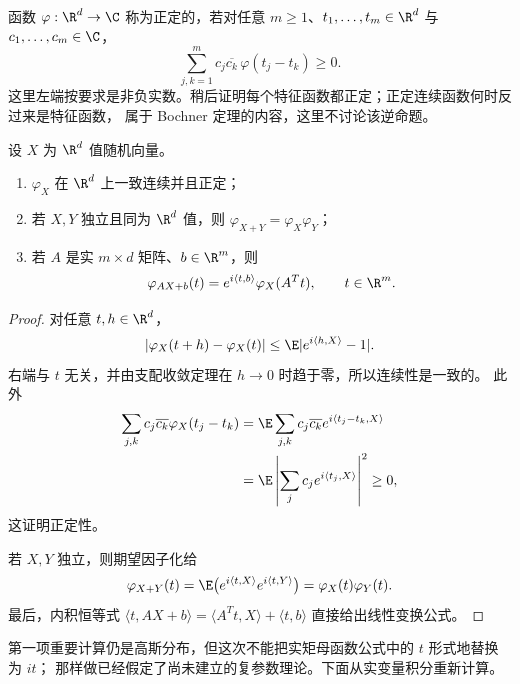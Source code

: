 \begin{definition}[正定函数]\label{def:5-4-3-2}
函数 $\varphi:\R^d\to\C$ 称为正定的，若对任意
$m\geq1$、$t_1,\dots,t_m\in\R^d$ 与 $c_1,\dots,c_m\in\C$，
\[
 \sum_{j,k=1}^mc_j\overline{c_k}\,\varphi(t_j-t_k)\geq0.
\]
这里左端按要求是非负实数。稍后证明每个特征函数都正定；正定连续函数何时反过来是特征函数，
属于 Bochner 定理的内容，这里不讨论该逆命题。
\end{definition}

\begin{proposition}[特征函数的基本性质]\label{proposition:5-4-3-1}
设 $X$ 为 $\R^d$ 值随机向量。
\begin{enumerate}
 \item $\varphi_X$ 在 $\R^d$ 上一致连续并且正定；
 \item 若 $X,Y$ 独立且同为 $\R^d$ 值，则
 $\varphi_{X+Y}=\varphi_X\varphi_Y$；
 \item 若 $A$ 是实 $m\times d$ 矩阵、$b\in\R^m$，则
 \[
  \varphi_{AX+b}(t)=e^{i\langle t,b\rangle}\varphi_X(A^Tt),
  \qquad t\in\R^m.
 \]
\end{enumerate}
\end{proposition}

\begin{proof}
对任意 $t,h\in\R^d$，
\[
 |\varphi_X(t+h)-\varphi_X(t)|
 \leq\E|e^{i\langle h,X\rangle}-1|.
\]
右端与 $t$ 无关，并由支配收敛定理在 $h\to0$ 时趋于零，所以连续性是一致的。
此外
\begin{align*}
 \sum_{j,k}c_j\overline{c_k}\varphi_X(t_j-t_k)
 &=\E\sum_{j,k}c_j\overline{c_k}
       e^{i\langle t_j-t_k,X\rangle}\\
 &=\E\left|\sum_jc_je^{i\langle t_j,X\rangle}\right|^2\geq0,
\end{align*}
这证明正定性。

若 $X,Y$ 独立，则期望因子化给
\[
 \varphi_{X+Y}(t)
 =\E\bigl(e^{i\langle t,X\rangle}e^{i\langle t,Y\rangle}\bigr)
 =\varphi_X(t)\varphi_Y(t).
\]
最后，内积恒等式
$\langle t,AX+b\rangle=\langle A^Tt,X\rangle+\langle t,b\rangle$
直接给出线性变换公式。
\end{proof}

第一项重要计算仍是高斯分布，但这次不能把实矩母函数公式中的 $t$ 形式地替换为 $it$；
那样做已经假定了尚未建立的复参数理论。下面从实变量积分重新计算。

